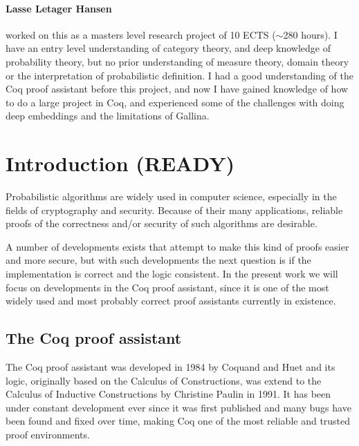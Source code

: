 \documentclass[11pt, leqno, titlepage]{article}
\theoremstyle{definition}
\begin{document}
\paragraph{Lasse Letager Hansen} worked on this as a masters level research project
of 10 ECTS ($\sim$280 hours). I have an entry level understanding of category theory,
and deep knowledge of probability theory, but no prior understanding of measure
theory, domain theory or the interpretation of probabilistic definition. I had a good
understanding of the Coq proof assistant before this project, and now I have gained
knowledge of how to do a large project in Coq, and experienced some of the challenges
with doing deep embeddings and the limitations of Gallina.

\vspace*{\fill}
\newpage

\tableofcontents
\newpage


\section{Introduction (READY)}
Probabilistic algorithms are widely used in computer science, especially in the
fields of cryptography and security. Because of their many applications, reliable
proofs of the correctness and/or security of such algorithms are desirable. 

A number of developments exists that attempt to make this kind of proofs easier and
more secure, but with such developments the next question is if the implementation is
correct and the logic consistent.  In the present work we will focus on developments
in the Coq proof assistant, since it is one of the most widely used and most probably
correct proof assistants currently in existence.

\subsection{The Coq proof assistant}
The Coq proof assistant was developed in 1984 by Coquand and Huet
\cite{coq-proof-ass} and its logic, originally based on the Calculus of
Constructions, was extend to the Calculus of Inductive Constructions by Christine
Paulin in 1991.  It has been under constant development ever since it was first
published and many bugs have been found and fixed over time, making Coq one of the
most reliable and trusted proof environments.
\end{document}
